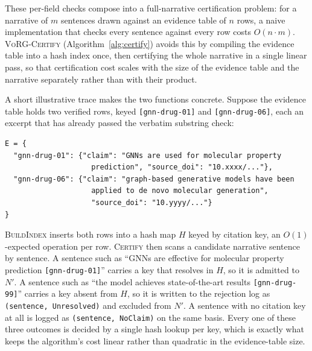 \documentclass[12pt,a4paper]{report}
\begin{document}
These per-field checks compose into a full-narrative certification problem: for
a narrative of $m$ sentences drawn against an evidence table of $n$ rows, a
naive implementation that checks every sentence against every row costs
$O(n \cdot m)$. \textsc{VoRG-Certify} (Algorithm~\ref{alg:certify}) avoids this
by compiling the evidence table into a hash index once, then certifying the
whole narrative in a single linear pass, so that certification cost scales
with the size of the evidence table and the narrative separately rather than
with their product.

A short illustrative trace makes the two functions concrete. Suppose the
evidence table holds two verified rows, keyed \texttt{[gnn-drug-01]} and
\texttt{[gnn-drug-06]}, each an excerpt that has already passed the verbatim
substring check:
\begin{verbatim}
E = {
  "gnn-drug-01": {"claim": "GNNs are used for molecular property
                    prediction", "source_doi": "10.xxxx/..."},
  "gnn-drug-06": {"claim": "graph-based generative models have been
                    applied to de novo molecular generation",
                    "source_doi": "10.yyyy/..."}
}
\end{verbatim}
\textsc{BuildIndex} inserts both rows into a hash map $H$ keyed by citation
key, an $O(1)$-expected operation per row. \textsc{Certify} then scans a
candidate narrative sentence by sentence. A sentence such as ``GNNs are
effective for molecular property prediction \texttt{[gnn-drug-01]}'' carries a
key that resolves in $H$, so it is admitted to $N'$. A sentence such as ``the
model achieves state-of-the-art results \texttt{[gnn-drug-99]}'' carries a key
absent from $H$, so it is written to the rejection log as
\texttt{(sentence, Unresolved)} and excluded from $N'$. A sentence with no
citation key at all is logged as \texttt{(sentence, NoClaim)} on the same
basis. Every one of these three outcomes is decided by a single hash lookup
per key, which is exactly what keeps the algorithm's cost linear rather than
quadratic in the evidence-table size.
\end{document}
